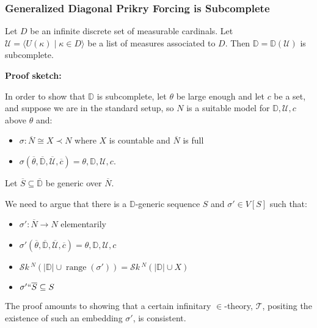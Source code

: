 \documentclass[utf8x,xcolor=svgnames,8pt]{beamer}
\newcommand{\D}{\mathbb{D}}
\newcommand{\N}{{\overline{N}}}
\renewcommand{\S}{{\overline{S}}}
\renewcommand{\U}{\mathcal{U}}
\DeclareMathOperator{\ran}{range}
\DeclareMathOperator{\otp}{otp}
\newcommand{\To}{\longrightarrow}
\newcommand{\st}{\; | \;}
\newcommand{\seq}[2]{\langle #1 \st #2 \rangle}
\newcommand{\SH}{\mathcal{S}\textit{k} \,}
\newcommand{\sk}[3]{\SH^{#1}( {#2} \cup {\ran(#3)} ) }
\newcommand{\Sk}[3]{\SH^{#1}( {#2} \cup {#3} ) }
\begin{document}
\begin{frame}
\frametitle{Generalized Diagonal Prikry Forcing is Subcomplete}
\begin{theorem} Let $D$ be an infinite discrete set of measurable cardinals. %
Let $\U = \seq{ U(\kappa) }{ \kappa \in D }$ be a list of measures associated to $D$. Then $\D=\D(\U)$ is subcomplete. \end{theorem}

\textbf{Proof sketch:}

\vspace{0.5em}

In order to show that $\D$ is subcomplete, let $\theta$ be large enough and let $c$ be a set, and suppose we are in the standard setup, so $N$ is a suitable model for $\D, \U, c$ above $\theta$  and: \begin{itemize}
	\item $\sigma: \N \cong X \prec N$ where $X$ is countable and $\N$ is full
	\item $\sigma(\overline \theta, \overline{\D}, \overline{\U}, \overline c)=\theta, \D, \U, c$.
\end{itemize}
Let $\S \subseteq \overline{\D}$ be generic over $\N$. 

We need to argue that there is a $\D$-generic sequence $S$ and $\sigma' \in V[S]$ such that: \begin{itemize}
	\item $\sigma': \N \To N$ elementarily
	\item $\sigma'(\overline \theta, \overline{\D}, \overline{\U}, \overline c)=\theta, \D, \U, c$
	\item $\sk{N}{|\D|}{\sigma'} = \Sk{N}{|\D|}{X}$	
	\item $\sigma' `` \S \subseteq S$
\end{itemize}
The proof amounts to showing that a certain infinitary $\in$-theory, $\mathcal T$, positing the existence of such an embedding $\sigma'$, is consistent.
\end{frame}

%
%
%
%
%
\end{document}
